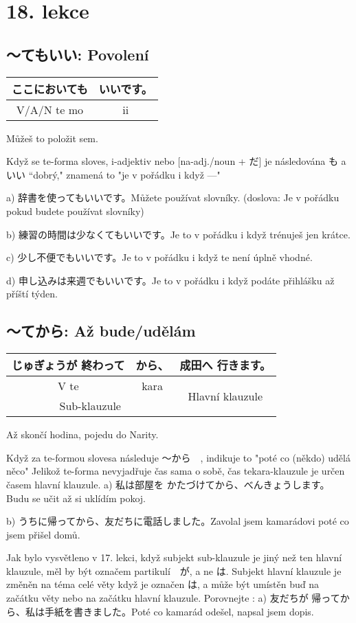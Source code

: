 \section{18. lekce}

\subsection{〜てもいい: Povolení}
\begin{tabular}{|c|c|}
\hline
ここにおいても &いいです。\\
\hline
V/A/N te mo&ii\\
\hline
\end{tabular}
Můžeš to položit sem.

Když se te-forma sloves, i-adjektiv nebo  [na-adj./noun + だ] je následována も a いい “dobrý," znamená to "je v pořádku i když ---"

a) 辞書を使ってもいいです。Můžete používat slovníky. (doslova: Je v pořádku pokud budete používat slovníky)

b) 練習の時間は少なくてもいいです。Je to v pořádku i když trénuješ jen krátce.

c) 少し不便でもいいです。Je to v pořádku i když te není úplně vhodné.

d) 申し込みは来週でもいいです。Je to v pořádku i když podáte přihlášku až příští týden.

\subsection{〜てから: Až bude/udělám}
\begin{tabular}{|c|c|c|}
\hline
じゅぎょうが 終わって & から、&成田へ 行きます。\\
\hline
V te &kara&\multirow{2}{*}{Hlavní klauzule}\\
\multicolumn{2}{c}{Sub-klauzule}&\\
\hline
\end{tabular}
Až skončí hodina, pojedu do Narity.

Když za te-formou slovesa následuje 〜から　, indikuje to  "poté co (někdo) udělá něco"
Jelikož te-forma nevyjadřuje čas sama o sobě, čas tekara-klauzule je určen časem hlavní klauzule.
a) 私は部屋を かたづけてから、べんきょうします。 Budu se učit až si uklídím pokoj.

b) うちに帰ってから、友だちに電話しました。Zavolal jsem kamarádovi poté co jsem přišel domů.


Jak bylo vysvětleno v 17. lekci, když subjekt sub-klauzule je jiný než ten hlavní klauzule, měl by být označem partikulí　が, a ne は. Subjekt hlavní klauzule je změněn na téma celé věty když je označen  は, a může být umístěn buď na začátku věty nebo na začátku hlavní klauzule.
Porovnejte :
a) 友だちが 帰ってから、私は手紙を書きました。Poté co kamarád odešel, napsal jsem dopis.

